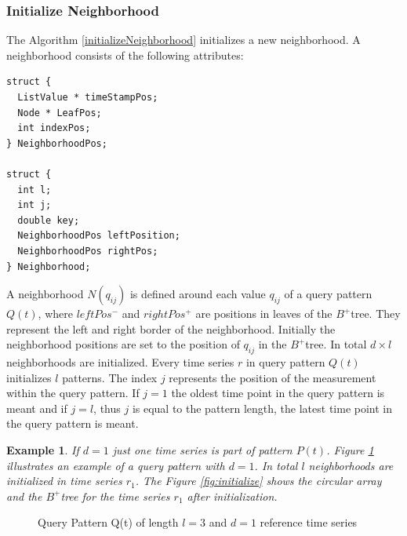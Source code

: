 \documentclass[abstracton,12pt]{scrreprt}
\newtheorem{example}{Example}
\begin{document}
\subsubsection{Initialize Neighborhood}
The Algorithm \ref{initializeNeighborhood} initializes a new neighborhood. A neighborhood consists of the following attributes: 
\lstset{language=C}
\begin{lstlisting}
struct {
  ListValue * timeStampPos;
  Node * LeafPos;
  int indexPos;
} NeighborhoodPos;

struct {
  int l;
  int j;
  double key;
  NeighborhoodPos leftPosition;
  NeighborhoodPos rightPos;
} Neighborhood;
\end{lstlisting}
\BlankLine
A neighborhood $N(q_{ij})$ is defined around each value $q_{ij}$ of a query pattern $Q(t)$, where $leftPos^-$ and $rightPos^+$ are positions in leaves of the $B^+$tree. They represent the left and right border of the neighborhood. Initially the neighborhood positions are set to the position of $q_{ij}$ in the $B^+$tree. In total $d \times l$ neighborhoods are initialized. Every time series $r$ in query pattern $Q(t)$ initializes $l$ patterns. The index $j$ represents the position of the measurement within the query pattern. If $j=1$ the oldest time point in the query pattern is meant and if $j=l$, thus $j$ is equal to the pattern length, the latest time point in the query pattern is meant. 



\begin{example}
	If $d=1$ just one time series is part of pattern $P(t)$. Figure \ref{Qpatt} illustrates an example of a query pattern with $d=1$. In total $l$ neighborhoods are initialized in time series $r_1$. The Figure \ref{fig:initialize} shows the circular array and the $B^+$tree for the time series $r_1$ after initialization.
\end{example}

\begin{figure}[H]
	\centering
	\caption{Query Pattern Q(t) of length $l=3$ and $d=1$ reference time series}
	\label{Qpatt}
\end{figure}
\end{document}
